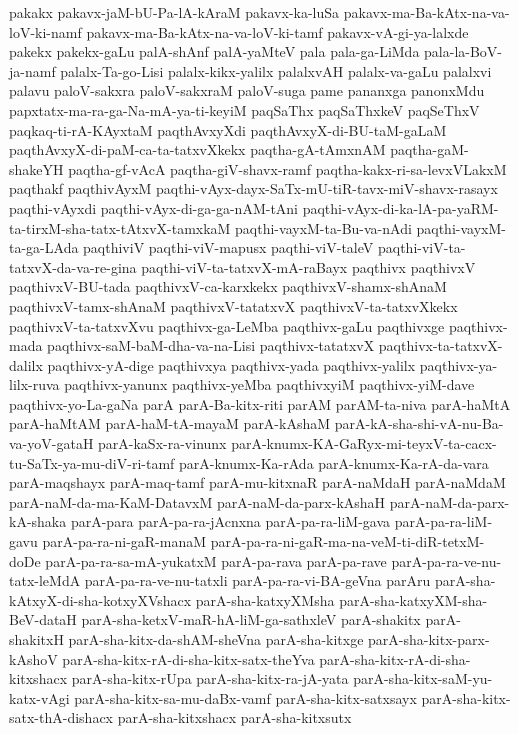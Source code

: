 {pakakx
pakavx-jaM-bU-Pa-lA-kAraM
pakavx-ka-luSa
pakavx-ma-Ba-kAtx-na-va-loV-ki-namf
pakavx-ma-Ba-kAtx-na-va-loV-ki-tamf
pakavx-vA-gi-ya-lalxde
pakekx
pakekx-gaLu
palA-shAnf
palA-yaMteV
pala
pala-ga-LiMda
pala-la-BoV-ja-namf
palalx-Ta-go-Lisi
palalx-kikx-yalilx
palalxvAH
palalx-va-gaLu
palalxvi
palavu
paloV-sakxra
paloV-sakxraM
paloV-suga
pame
pananxga
panonxMdu
papxtatx-ma-ra-ga-Na-mA-ya-ti-keyiM
paqSaThx
paqSaThxkeV
paqSeThxV
paqkaq-ti-rA-KAyxtaM
paqthAvxyXdi
paqthAvxyX-di-BU-taM-gaLaM
paqthAvxyX-di-paM-ca-ta-tatxvXkekx
paqtha-gA-tAmxnAM
paqtha-gaM-shakeYH
paqtha-gf-vAcA
paqtha-giV-shavx-ramf
paqtha-kakx-ri-sa-levxVLakxM
paqthakf
paqthivAyxM
paqthi-vAyx-dayx-SaTx-mU-tiR-tavx-miV-shavx-rasayx
paqthi-vAyxdi
paqthi-vAyx-di-ga-ga-nAM-tAni
paqthi-vAyx-di-ka-lA-pa-yaRM-ta-tirxM-sha-tatx-tAtxvX-tamxkaM
paqthi-vayxM-ta-Bu-va-nAdi
paqthi-vayxM-ta-ga-LAda
paqthiviV
paqthi-viV-mapusx
paqthi-viV-taleV
paqthi-viV-ta-tatxvX-da-va-re-gina
paqthi-viV-ta-tatxvX-mA-raBayx
paqthivx
paqthivxV
paqthivxV-BU-tada
paqthivxV-ca-karxkekx
paqthivxV-shamx-shAnaM
paqthivxV-tamx-shAnaM
paqthivxV-tatatxvX
paqthivxV-ta-tatxvXkekx
paqthivxV-ta-tatxvXvu
paqthivx-ga-LeMba
paqthivx-gaLu
paqthivxge
paqthivx-mada
paqthivx-saM-baM-dha-va-na-Lisi
paqthivx-tatatxvX
paqthivx-ta-tatxvX-dalilx
paqthivx-yA-dige
paqthivxya
paqthivx-yada
paqthivx-yalilx
paqthivx-ya-lilx-ruva
paqthivx-yanunx
paqthivx-yeMba
paqthivxyiM
paqthivx-yiM-dave
paqthivx-yo-La-gaNa
parA
parA-Ba-kitx-riti
parAM
parAM-ta-niva
parA-haMtA
parA-haMtAM
parA-haM-tA-mayaM
parA-kAshaM
parA-kA-sha-shi-vA-nu-Ba-va-yoV-gataH
parA-kaSx-ra-vinunx
parA-knumx-KA-GaRyx-mi-teyxV-ta-cacx-tu-SaTx-ya-mu-diV-ri-tamf
parA-knumx-Ka-rAda
parA-knumx-Ka-rA-da-vara
parA-maqshayx
parA-maq-tamf
parA-mu-kitxnaR
parA-naMdaH
parA-naMdaM
parA-naM-da-ma-KaM-DatavxM
parA-naM-da-parx-kAshaH
parA-naM-da-parx-kA-shaka
parA-para
parA-pa-ra-jAcnxna
parA-pa-ra-liM-gava
parA-pa-ra-liM-gavu
parA-pa-ra-ni-gaR-manaM
parA-pa-ra-ni-gaR-ma-na-veM-ti-diR-tetxM-doDe
parA-pa-ra-sa-mA-yukatxM
parA-pa-rava
parA-pa-rave
parA-pa-ra-ve-nu-tatx-leMdA
parA-pa-ra-ve-nu-tatxli
parA-pa-ra-vi-BA-geVna
parAru
parA-sha-kAtxyX-di-sha-kotxyXVshacx
parA-sha-katxyXMsha
parA-sha-katxyXM-sha-BeV-dataH
parA-sha-ketxV-maR-hA-liM-ga-sathxleV
parA-shakitx
parA-shakitxH
parA-sha-kitx-da-shAM-sheVna
parA-sha-kitxge
parA-sha-kitx-parx-kAshoV
parA-sha-kitx-rA-di-sha-kitx-satx-theYva
parA-sha-kitx-rA-di-sha-kitxshacx
parA-sha-kitx-rUpa
parA-sha-kitx-ra-jA-yata
parA-sha-kitx-saM-yu-katx-vAgi
parA-sha-kitx-sa-mu-daBx-vamf
parA-sha-kitx-satxsayx
parA-sha-kitx-satx-thA-dishacx
parA-sha-kitxshacx
parA-sha-kitxsutx
}
